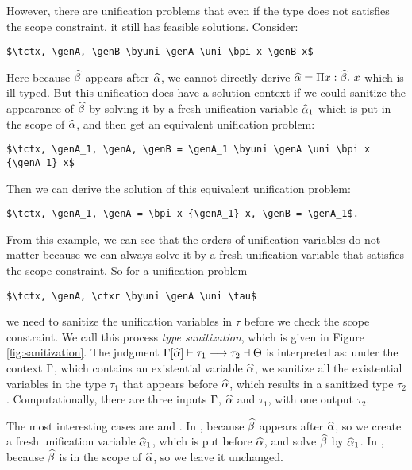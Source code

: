 However, there are unification problems that even if the type does not satisfies the
scope constraint, it still has feasible solutions. Consider:

\begin{lstlisting}
$\tctx, \genA, \genB \byuni \genA \uni \bpi x \genB x$
\end{lstlisting}

Here because $\widehat{\beta}$ appears after $\widehat{\alpha}$, we cannot directly derive $\widehat{\alpha} =
\Pi x:\widehat{\beta}.~ x$ which is ill typed.
But this unification does have a solution context if we could sanitize the
appearance of $\widehat{\beta}$ by solving it by a fresh unification variable $\widehat{\alpha}_1$
which is put in the scope of $\widehat{\alpha}$, and then
get an equivalent unification problem:

\begin{lstlisting}
$\tctx, \genA_1, \genA, \genB = \genA_1 \byuni \genA \uni \bpi x {\genA_1} x$
\end{lstlisting}

\noindent Then we can derive the solution of this equivalent unification problem:

\begin{lstlisting}
$\tctx, \genA_1, \genA = \bpi x {\genA_1} x, \genB = \genA_1$.
\end{lstlisting}

From this example, we can see that the orders of unification variables do not
matter because we can always solve it by a fresh unification variable that
satisfies the scope constraint. So for a unification problem

\begin{lstlisting}
$\tctx, \genA, \ctxr \byuni \genA \uni \tau$
\end{lstlisting}

\noindent we need to sanitize the unification variables in $\tau$
before we check the scope constraint. We call this process \textit{type
  sanitization}, which is given in Figure \ref{fig:sanitization}.
The judgment $\Gamma[\widehat{\alpha}] \vdash \tau_1 \longrightarrow \tau_2 \dashv \Theta$ is interpreted as:
under the context $\Gamma$, which contains an existential variable $\widehat{\alpha}$,
we sanitize all the existential variables in the type $\tau_1$ that appears
before $\widehat{\alpha}$, which results in a sanitized type $\tau_2$.
Computationally, there are three inputs $\Gamma$, $\widehat{\alpha}$ and $\tau_1$, with one
output $\tau_2$.

The most
interesting cases are  and .
In ,
because $\widehat{\beta}$ appears after $\widehat{\alpha}$, so we create a fresh unification variable
$\widehat{\alpha}_1$, which is put before $\widehat{\alpha}$, and solve $\widehat{\beta}$ by $\widehat{\alpha}_1$. In
, because $\widehat{\beta}$ is in the scope of $\widehat{\alpha}$, so we leave it
unchanged.

